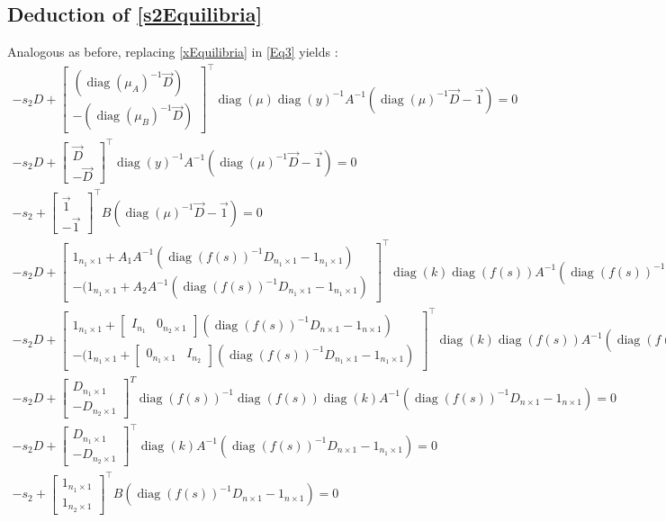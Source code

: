\documentclass[3p,times]{article}
\DeclareMathOperator{\diag}{diag}
\begin{document}
\subsection{Deduction of \eqref{s2Equilibria}}
Analogous as before, replacing \eqref{xEquilibria} in \eqref{Eq3} yields :
\begin{align}
-s_2D+
\begin{bmatrix}
(\diag(\mu_A)^{-1} \vec{D}) \\ -(\diag(\mu_B)^{-1} \vec{D})
\end{bmatrix}^\top \diag(\mu)\diag(y)^{-1} A^{-1}(\diag(\mu)^{-1}\vec{D}-\vec{1}) = 0 \\
-s_2D+
\begin{bmatrix}
\vec{D} \\ - \vec{D}
\end{bmatrix}^\top \diag(y)^{-1} A^{-1}(\diag(\mu)^{-1}\vec{D}-\vec{1}) = 0\\
-s_2+
\begin{bmatrix}
\vec{1} \\ - \vec{1}
\end{bmatrix}^\top B(\diag(\mu)^{-1}\vec{D}-\vec{1}) = 0
\end{align}
\begin{align} 
-s_2D+ \begin{bmatrix}
1_{n_1 \times 1}+A_1A^{-1}(\diag(f(s))^{-1}D_{n_1 \times 1}-1_{n_1 \times 1}) \\-(1_{n_1 \times 1}+A_2A^{-1}(\diag(f(s))^{-1}D_{n_1 \times 1}-1_{n_1 \times 1})
\end{bmatrix}^\top \diag(k)\diag(f(s))A^{-1}(\diag(f(s))^{-1}D_{n \times 1}-1_{n \times 1}) = 0 \\
-s_2D+	\begin{bmatrix}
1_{n_1 \times 1}+\begin{bmatrix}
I_{n_1} & 0_{n_2 \times 1} 
\end{bmatrix}(\diag(f(s))^{-1}D_{n \times 1}-1_{n \times 1}) \\-(1_{n_1 \times 1}+\begin{bmatrix}
0_{n_1 \times 1} & I_{n_2} 
\end{bmatrix}(\diag(f(s))^{-1}D_{n_1 \times 1}-1_{n_1 \times 1})
\end{bmatrix}^\top \diag(k)\diag(f(s))A^{-1}(\diag(f(s))^{-1}D_{n \times 1}-1_{n \times 1}) = 0 \\
-s_2D +	\begin{bmatrix}
D_{n_1 \times 1}\\-D_{n_2 \times 1}
\end{bmatrix}^T\diag(f(s))^{-1}\diag(f(s)) \diag(k) A^{-1}(\diag(f(s))^{-1}D_{n \times 1}-1_{n \times 1}) = 0  \\
-s_2D+\begin{bmatrix}
D_{n_1 \times 1} \\-D_{n_2\times 1}
\end{bmatrix}^\top \diag(k)A^{-1}(\diag(f(s))^{-1}D_{n \times 1}-1_{n_1 \times 1}) = 0 \\
-s_2 + \begin{bmatrix}
1_{n_1 \times 1}\\1_{n_2 \times 1}
\end{bmatrix}^\top B (\diag(f(s))^{-1}D_{n \times 1} - 1_{n \times 1}) = 0 
\end{align}
\end{document}
